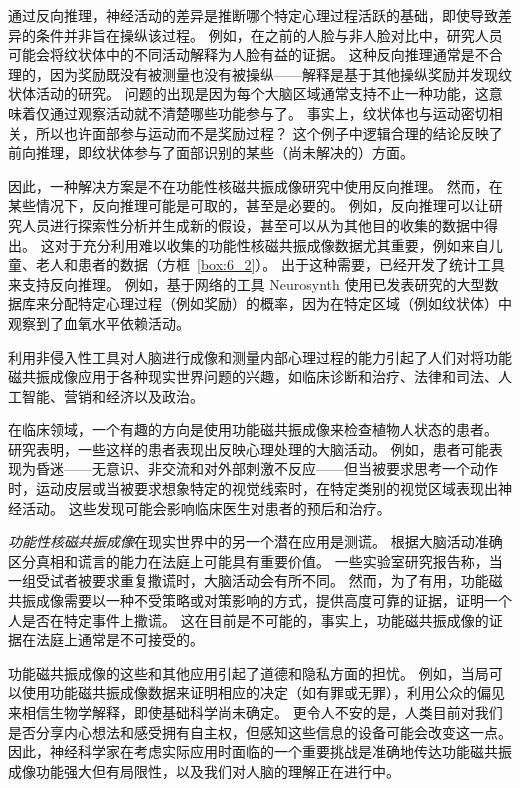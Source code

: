 通过反向推理，神经活动的差异是推断哪个特定心理过程活跃的基础，即使导致差异的条件并非旨在操纵该过程。 
例如，在之前的人脸与非人脸对比中，研究人员可能会将纹状体中的不同活动解释为人脸有益的证据。
这种反向推理通常是不合理的，因为奖励既没有被测量也没有被操纵——解释是基于其他操纵奖励并发现纹状体活动的研究。
问题的出现是因为每个大脑区域通常支持不止一种功能，这意味着仅通过观察活动就不清楚哪些功能参与了。
事实上，纹状体也与运动密切相关，所以也许面部参与运动而不是奖励过程？
这个例子中逻辑合理的结论反映了前向推理，即纹状体参与了面部识别的某些（尚未解决的）方面。


因此，一种解决方案是不在功能性核磁共振成像研究中使用反向推理。
然而，在某些情况下，反向推理可能是可取的，甚至是必要的。
例如，反向推理可以让研究人员进行探索性分析并生成新的假设，甚至可以从为其他目的收集的数据中得出。 
这对于充分利用难以收集的功能性核磁共振成像数据尤其重要，例如来自儿童、老人和患者的数据（方框~\ref{box:6_2}）。
出于这种需要，已经开发了统计工具来支持反向推理。 
例如，基于网络的工具 Neurosynth 使用已发表研究的大型数据库来分配特定心理过程（例如奖励）的概率，因为在特定区域（例如纹状体）中观察到了血氧水平依赖活动。


\begin{proposition}[现实世界中的大脑成像] \label{box:6_2}
	
	\quad \quad 利用非侵入性工具对人脑进行成像和测量内部心理过程的能力引起了人们对将功能磁共振成像应用于各种现实世界问题的兴趣，如临床诊断和治疗、法律和司法、人工智能、营销和经济以及政治。
	
	\quad \quad 在临床领域，一个有趣的方向是使用功能磁共振成像来检查植物人状态的患者。
	研究表明，一些这样的患者表现出反映心理处理的大脑活动。
	例如，患者可能表现为昏迷——无意识、非交流和对外部刺激不反应——但当被要求思考一个动作时，运动皮层或当被要求想象特定的视觉线索时，在特定类别的视觉区域表现出神经活动。
	这些发现可能会影响临床医生对患者的预后和治疗。
	
	\quad \quad \textit{功能性核磁共振成像}在现实世界中的另一个潜在应用是测谎。
	根据大脑活动准确区分真相和谎言的能力在法庭上可能具有重要价值。
	一些实验室研究报告称，当一组受试者被要求重复撒谎时，大脑活动会有所不同。
	然而，为了有用，功能磁共振成像需要以一种不受策略或对策影响的方式，提供高度可靠的证据，证明一个人是否在特定事件上撒谎。
	这在目前是不可能的，事实上，功能磁共振成像的证据在法庭上通常是不可接受的。
	
	\quad \quad 功能磁共振成像的这些和其他应用引起了道德和隐私方面的担忧。
	例如，当局可以使用功能磁共振成像数据来证明相应的决定（如有罪或无罪），利用公众的偏见来相信生物学解释，即使基础科学尚未确定。
	更令人不安的是，人类目前对我们是否分享内心想法和感受拥有自主权，但感知这些信息的设备可能会改变这一点。
	因此，神经科学家在考虑实际应用时面临的一个重要挑战是准确地传达功能磁共振成像功能强大但有局限性，以及我们对人脑的理解正在进行中。
	
\end{proposition}


